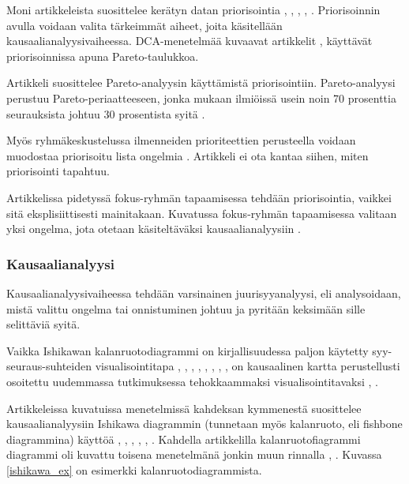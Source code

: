 Moni artikkeleista suosittelee kerätyn datan priorisointia \citep{card1998learning}, \citep{birk2002postmortem}, \citep{staalhane2003post}, \citep{staalhane2004root}, \citep{karlsson2006case}. Priorisoinnin avulla voidaan valita tärkeimmät aiheet, joita käsitellään kausaalianalyysivaiheessa. DCA-menetelmää kuvaavat artikkelit \citep{kalinowski2012evidence}, \citep{card1998learning} käyttävät priorisoinnissa apuna Pareto-taulukkoa.

Artikkeli \citep{staalhane2004root} suosittelee Pareto-analyysin käyttämistä priorisointiin. Pareto-analyysi perustuu Pareto-periaatteeseen, jonka mukaan ilmiöissä usein noin 70 prosenttia seurauksista johtuu 30 prosentista syitä \citep{staalhane2004root}. 

Myös ryhmäkeskustelussa ilmenneiden prioriteettien perusteella voidaan muodostaa priorisoitu lista ongelmia \citep{staalhane2003post}. Artikkeli \citep{birk2002postmortem} ei ota kantaa siihen, miten priorisointi tapahtuu.

Artikkelissa \citep{Lehtinen2011} pidetyssä fokus-ryhmän tapaamisessa tehdään priorisointia, vaikkei sitä eksplisiittisesti mainitakaan. Kuvatussa fokus-ryhmän tapaamisessa valitaan yksi ongelma, jota otetaan käsiteltäväksi kausaalianalyysiin \citep{Lehtinen2011}.

\subsubsection{Kausaalianalyysi}
Kausaalianalyysivaiheessa tehdään varsinainen juurisyyanalyysi, eli analysoidaan, mistä valittu ongelma tai onnistuminen johtuu ja pyritään keksimään sille selittäviä syitä. 

Vaikka Ishikawan kalanruotodiagrammi \citep{ishikawa1990introduction} on kirjallisuudessa paljon käytetty syy-seuraus-suhteiden visualisointitapa \citep{kalinowski2012evidence}, \citep{Bjornson2009}, \citep{de2004learning}, \citep{staalhane2004root}, \citep{dingsoyr2003extending}, \citep{staalhane2003post}, \citep{birk2002postmortem}, \citep{card1998learning}, on kausaalinen kartta perustellusti osoitettu uudemmassa tutkimuksessa tehokkaammaksi visualisointitavaksi \citep{Bjornson2009}, \citep{Lehtinen2011}. 

Artikkeleissa kuvatuissa menetelmissä kahdeksan kymmenestä suosittelee kausaalianalyysiin Ishikawa diagrammin (tunnetaan myös kalanruoto, eli fishbone diagrammina) käyttöä \citep{kalinowski2012evidence}, \citep{de2004learning}, \citep{staalhane2004root}, \citep{dingsoyr2003extending}, \citep{birk2002postmortem}, \citep{card1998learning}. Kahdella artikkelilla kalanruotofiagrammi diagrammi oli kuvattu toisena menetelmänä jonkin muun rinnalla \citep{Bjornson2009}, \citep{staalhane2003post}. Kuvassa \ref{ishikawa_ex} on esimerkki kalanruotodiagrammista.


